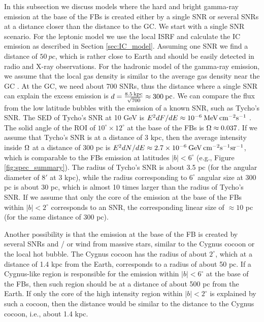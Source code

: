 In this subsection we discuss models where the hard and bright gamma-ray emission at the base of the FBs is created either by a single SNR
or several SNRs at a distance closer than the distance to the GC.
We start with a single SNR scenario.
For the leptonic model we use the local ISRF and calculate the IC emission as described in Section \ref{sec:IC_model}.
Assuming one SNR we find a distance of $\SI{50}{pc}$, which is rather close to Earth and should 
be easily detected in radio and X-ray observations.
For the hadronic model of the gamma-ray emission, we assume that 
the local gas density is similar to the average gas density near the GC \citep{2017ApJ...834...57M}.
At the GC, we need about 700 SNRs, thus the distance where a single SNR can explain the excess emission
is $d = \frac{8.5\: {\rm kpc}}{\sqrt{700}} \approx 300\:{\rm pc}$.
We can compare the flux from the low latitude bubbles with the emission of a known SNR, such as Tycho's SNR.
The SED of Tycho's SNR at 10 GeV is $E^2 {dF}/{dE} \approx 10^{-6}\: {\rm MeV\, cm^{-2} s^{-1}}$ \citep{2017ApJ...836...23A}.
The solid angle of the ROI of $10^\circ \times 12^\circ$ at the base of the FBs is $\Omega \approx 0.037$.
If we assume that Tycho's SNR is at a distance of 3 kpc, then the average intensity inside $\Omega$ at a distance of 300 pc
is $E^2 {dN}/{dE} \approx 2.7 \times 10^{-6}\: {\rm GeV\, cm^{-2} s^{-1} sr^{-1}}$, which is comparable to the 
FBs emission at latitudes $|b| < 6^\circ$ (e.g., Figure \ref{fig:spec_summary}).
The radius of Tycho's SNR is about 3.5 pc (for the angular diameter of $8'$ at 3 kpc),
while the radius corresponding to $6^\circ$ angular size at 300 pc is about 30 pc, which is almost 10 times larger than the radius of Tycho's SNR.
If we assume that only the core of the emission at the base of the FBs within $|b| < 2^\circ$ corresponds to an SNR,
the corresponding linear size of $\approx 10$ pc (for the same distance of 300 pc).

Another possibility is that the emission at the base of the FB is created by several SNRs and / or wind from
massive stars, similar to the Cygnus cocoon \citep{2011Sci...334.1103A} or the local hot bubble.
The Cygnus cocoon \citep{2011Sci...334.1103A} has the radius of about $2^\circ$, 
which at a distance of 1.4 kpc from the Earth, corresponds to a radius of about 50 pc.
If a Cygnus-like region is responsible for the emission within $|b| < 6^\circ$ at the base of the FBs,
then such region should be at a distance of about 500 pc from the Earth.
If only the core of the high intensity region within $|b| < 2^\circ$ is explained by such a cocoon,
then the distance would be similar to the distance to the Cygnus cocoon, i.e., about 1.4 kpc.

